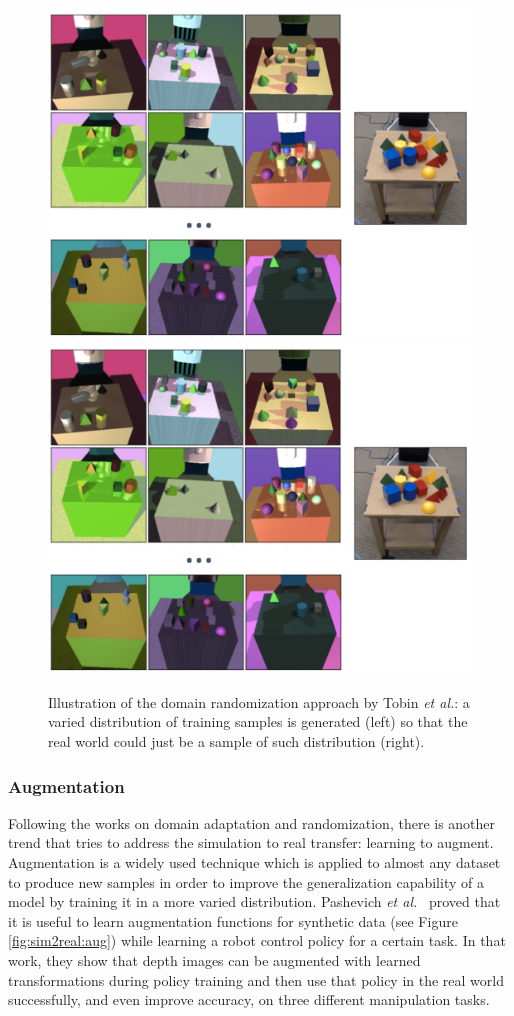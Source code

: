 \begin{figure}[!htb]
    \centering
    \includegraphics[width=0.55\linewidth, clip, trim=0 300 300 0]{Figures/Sim2Real/dr.png}
    \includegraphics[width=0.25\linewidth, clip, trim=720 200 0 0]{Figures/Sim2Real/dr.png}
    \caption{Illustration of the domain randomization approach by Tobin \emph{et al.}\cite{Tobin2017}: a varied distribution of training samples is generated (left) so that the real world could just be a sample of such distribution (right).}
    \label{fig:sim2real:dr}
\end{figure}

\clearpage

\subsubsection{Augmentation}

Following the works on domain adaptation and randomization, there is another trend that tries to address the simulation to real transfer: learning to augment. Augmentation is a widely used technique which is applied to almost any dataset to produce new samples in order to improve the generalization capability of a model by training it in a more varied distribution. Pashevich \emph{et al.}~\cite{Pashevich2019} proved that it is useful to learn augmentation functions for synthetic data (see Figure \ref{fig:sim2real:aug}) while learning a robot control policy for a certain task. In that work, they show that depth images can be augmented with learned transformations during policy training and then use that policy in the real world successfully, and even improve accuracy, on three different manipulation tasks.

